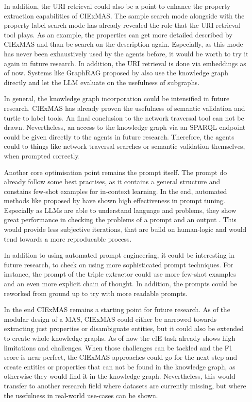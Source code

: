 \documentclass[a4paper,oneside,bibliography=totoc]{scrbook}
\begin{document}
In addition, the URI retrieval could also be a point to enhance the property extraction capabilities of CIExMAS. The sample search mode alongside with the property label search mode has already revealed the role that the URI retrieval tool plays. As an example, the properties can get more detailed described by CIExMAS and than be search on the description again. Especially, as this mode has never been exhaustively used by the agents before, it would be worth to try it again in future research. In addition, the URI retrieval is done via embeddings as of now. Systems like GraphRAG proposed by \citet{Edge2025} also use the knowledge graph directly and let the \ac{LLM} evaluate on the usefulness of subgraphs.

In general, the knowledge graph incorporation could be intensified in future research. CIExMAS has already proven the usefulness of semantic validation and turtle to label tools. An final conclusion to the network traversal tool can not be drawn. Nevertheless, an access to the knowledge graph via an SPARQL endpoint could be given directly to the agents in future research. Therefore, the agents could to things like network traversal searches or semantic validation themselves, when prompted correctly.

Another core optimisation point remains the prompt itself. The prompt do already follow some best practises, as it contains a general structure and constains few-shot examples for in-context learning. In the end, automated methods like proposed by \citet{Agrawal2025} have shown high effectiveness in prompt tuning. Especially as \acp{LLM} are able to understand language and problems, they show great performance in checking the problems of a prompt and an output \cite{Agrawal2025}. This would provide less subjective iterations, that are build on human-logic and would tend towards a more reproducable process.

In addition to using automated prompt engineering, it could be interesting in future research, to check on using more sophisticated prompt techniques. For instance, the prompt of the triple extractor could use more few-shot examples and an even more explicit chain of thought. In addition, the prompts could be reworked from ground up to try with more readable prompts.

In the end CIExMAS remains a starting point for future research. As of the modular design of a \ac{MAS}, CIExMAS could either be narrowed towards extracting just properties or disambiguate entities, but it could also be extended to create whole knowledge graphs. As of now the \ac{cIE} task already shows high limitations and challenges. When those challenges can be tackled and the F1 score is near perfect, the CIExMAS approaches could go for the next step and create entities or properties that can not be found in the knowledge graph, as otherwise they would find it in the knowledge graph. Nevertheless, this would transfer to another research field where datasets are currently missing, but where the usefulness in real-world use-cases can be shown.
\end{document}
